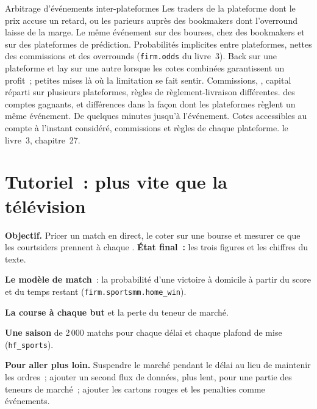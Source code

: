 \begin{strategyfile}{Arbitrage d'événements inter-plateformes}\label{strat:hf:prediction-and-sports-market-making:cross}
 Les traders de la plateforme dont le prix accuse un retard, ou les parieurs auprès des bookmakers dont l'overround laisse de la marge.
 Le même événement sur des bourses, chez des bookmakers et sur des plateformes de prédiction.
 Probabilités implicites entre plateformes, nettes des commissions et des overrounds (\texttt{firm.odds} du livre~3).
 Back sur une plateforme et lay sur une autre lorsque les cotes combinées garantissent un profit~; petites mises là où la limitation se fait sentir.
 Commissions, , capital réparti sur plusieurs plateformes, règles de règlement-livraison différentes.
  des comptes gagnants, et différences dans la façon dont les plateformes règlent un même événement.
 De quelques minutes jusqu'à l'événement.
 Cotes accessibles au compte à l'instant considéré, commissions et règles de chaque plateforme.
 le livre~3, chapitre~27.
\end{strategyfile}

\section{Tutoriel~: plus vite que la télévision}\label{tut:hf:prediction-and-sports-market-making:tut}

\begin{tutorial}
\textbf{Objectif.} Pricer un match en direct, le coter sur une bourse et mesurer ce que les courtsiders prennent à chaque . \textbf{État final~:} les trois
figures et les chiffres du texte.
\begin{tutsteps}
\item \textbf{Le modèle de match}~: la probabilité d'une victoire à domicile à partir du score et du temps restant (\texttt{firm.sportsmm.home\_win}).
\item \textbf{La course à chaque but} et la perte du teneur de marché.
\label{lst:hf:prediction-and-sports-market-making:trade}
\item \textbf{Une saison} de 2\,000 matchs pour chaque délai et chaque plafond de mise (\texttt{hf\_sports}).
\end{tutsteps}
\textbf{Pour aller plus loin.} Suspendre le marché pendant le délai au lieu de maintenir les ordres~; ajouter un second flux de données, plus lent, pour une partie des
teneurs de marché~; ajouter les cartons rouges et les penalties comme événements.
\end{tutorial}

